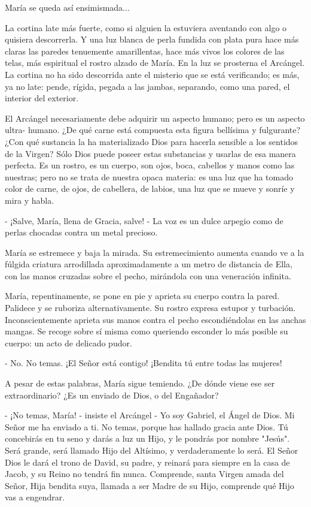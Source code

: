 \documentclass[12pt, twoside, openright]{book} %
\begin{document}
María se queda así ensimismada... 

La cortina late más fuerte, como si alguien la estuviera aventando con algo o quisiera descorrerla. Y una luz blanca de perla fundida con plata pura hace más claras las paredes tenuemente amarillentas, hace más vivos los colores de las telas, más espiritual el rostro alzado de María. En la luz se prosterna el Arcángel. La cortina no ha sido descorrida ante el misterio que se está verificando; es más, ya no late: pende, rígida, pegada a las jambas, separando, como una pared, el interior del exterior. 

El Arcángel necesariamente debe adquirir un aspecto humano; pero es un aspecto ultra- humano. ¿De qué carne está compuesta esta figura bellísima y fulgurante? ¿Con qué sustancia la ha materializado Dios para hacerla sensible a los sentidos de la Virgen? Sólo Dios puede poseer estas substancias y usarlas de esa manera perfecta. Es un rostro, es un cuerpo, son ojos, boca, cabellos y manos como las nuestras; pero no se trata de nuestra opaca materia: es una luz que ha tomado color de carne, de ojos, de cabellera, de labios, una luz que se mueve y sonríe y mira y habla. 

- ¡Salve, María, llena de Gracia, salve! - La voz es un dulce arpegio como de perlas chocadas contra un metal precioso. 

María se estremece y baja la mirada. Su estremecimiento aumenta cuando ve a la fúlgida criatura arrodillada aproximadamente a un metro de distancia de Ella, con las manos cruzadas sobre el pecho, mirándola con una veneración infinita. 

María, repentinamente, se pone en pie y aprieta su cuerpo contra la pared. Palidece y se ruboriza alternativamente. Su rostro expresa estupor y turbación. Inconscientemente aprieta sus manos contra el pecho escondiéndolas en las anchas mangas. Se recoge sobre sí misma como queriendo esconder lo más posible su cuerpo: un acto de delicado pudor. 

- No. No temas. ¡El Señor está contigo! ¡Bendita tú entre todas las mujeres! 

A pesar de estas palabras, María sigue temiendo. ¿De dónde viene ese ser extraordinario? ¿Es un enviado de Dios, o del Engañador? 

- ¡No temas, María! - insiste el Arcángel - Yo soy Gabriel, el Ángel de Dios. Mi Señor me ha enviado a ti. No temas, porque has hallado gracia ante Dios. Tú concebirás en tu seno y darás a luz un Hijo, y le pondrás por nombre "Jesús". Será grande, será llamado Hijo del Altísimo, y verdaderamente lo será. El Señor Dios le dará el trono de David, su padre, y reinará para siempre en la casa de Jacob, y su Reino no tendrá fin nunca. Comprende, santa Virgen amada del Señor, Hija bendita suya, llamada a ser Madre de su Hijo, comprende qué Hijo vas a engendrar. 
\end{document}
